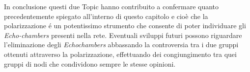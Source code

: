 In conclusione questi due Topic hanno contribuito a confermare quanto precedentemente spiegato all'interno di questo capitolo e cioè che la polarizzazione \'e un potentissimo strumento che consente di poter individuare gli \textit{Echo-chambers} presenti nella rete. %
Eventuali sviluppi futuri possono riguardare l'eliminazione degli \textit{Echochambers} abbassando la controversia tra i due gruppi ottenuti attraverso la polarizzazione, effettuando dei congiungimento tra quei gruppi di nodi che condividono sempre le stesse opinioni.
\begin{comment}
\section{Inquadramento generale}
La prima parte contiene una frase che spiega l'area generale dove si svolge il lavoro; una che spiega la sottoarea pi\`u specifica dove si svolge il lavoro e la terza, che dovrebbe cominciare con le seguenti parole ``lo scopo della tesi \`e \dots'', illustra l'obbiettivo del lavoro. Poi vi devono essere una o due frasi che contengano una breve spiegazione di cosa e come \`e stato fatto, delle attivit\`a� sperimentali, dei risultati ottenuti con una valutazione e degli sviluppi futuri. La prima parte deve essere circa una facciata e mezza o due

\section{Breve descrizione del lavoro}
La seconda parte deve essere una esplosione della prima e deve quindi mostrare in maniera pi\`u esplicita l'area dove si svolge il lavoro, le fonti bibliografiche pi\`u importanti su cui si fonda il lavoro in maniera sintetica (una pagina) evidenziando i lavori in letteratura che presentano attinenza con il lavoro affrontato in modo da mostrare da dove e perch\'e \`e sorta la tematica di studio. Poi si mostrano esplicitamente le realizzazioni, le direttive future di ricerca, quali sono i problemi aperti e quali quelli affrontati e si ripete lo scopo della tesi. Questa parte deve essere piena (ma non grondante come la sezione due) di citazioni bibliografiche e deve essere lunga circa 4 facciate.


\end{comment}
